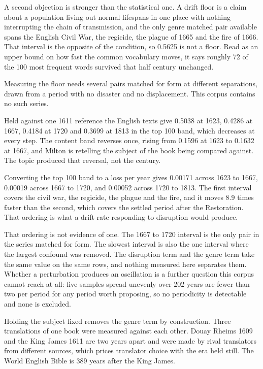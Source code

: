 A second objection is stronger than the statistical one. A drift floor is a claim about a population living out normal lifespans in one place with nothing interrupting the chain of transmission, and the only genre matched pair available spans the English Civil War, the regicide, the plague of 1665 and the fire of 1666. That interval is the opposite of the condition, so 0.5625 is not a floor. Read as an upper bound on how fast the common vocabulary moves, it says roughly 72 of the 100 most frequent words survived that half century unchanged.

Measuring the floor needs several pairs matched for form at different separations, drawn from a period with no disaster and no displacement. This corpus contains no such series.

Held against one 1611 reference the English texts give 0.5038 at 1623, 0.4286 at 1667, 0.4184 at 1720 and 0.3699 at 1813 in the top 100 band, which decreases at every step. The content band reverses once, rising from 0.1596 at 1623 to 0.1632 at 1667, and Milton is retelling the subject of the book being compared against. The topic produced that reversal, not the century.

Converting the top 100 band to a loss per year gives 0.00171 across 1623 to 1667, 0.00019 across 1667 to 1720, and 0.00052 across 1720 to 1813. The first interval covers the civil war, the regicide, the plague and the fire, and it moves 8.9 times faster than the second, which covers the settled period after the Restoration. That ordering is what a drift rate responding to disruption would produce.

That ordering is not evidence of one. The 1667 to 1720 interval is the only pair in the series matched for form. The slowest interval is also the one interval where the largest confound was removed. The disruption term and the genre term take the same value on the same rows, and nothing measured here separates them. Whether a perturbation produces an oscillation is a further question this corpus cannot reach at all: five samples spread unevenly over 202 years are fewer than two per period for any period worth proposing, so no periodicity is detectable and none is excluded.

Holding the subject fixed removes the genre term by construction. Three translations of one book were measured against each other. Douay Rheims 1609 and the King James 1611 are two years apart and were made by rival translators from different sources, which prices translator choice with the era held still. The World English Bible is 389 years after the King James.

